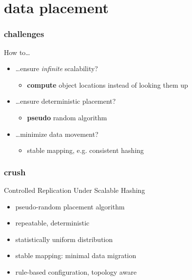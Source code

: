 \documentclass[10pt, compress]{beamer}
\begin{document}
\section{data placement}
\begin{frame}[fragile]
    \frametitle{challenges}
    \begin{block}{How to\dots}
        \begin{itemize}[<+->]
            \item[]\dots ensure \textit{infinite} scalability?
                \begin{itemize}
                    \item \textbf{compute} object locations instead of looking 
                        them up
                \end{itemize}
            \item[]\dots ensure deterministic placement?
                \begin{itemize}
                    \item \textbf{pseudo} random algorithm
                \end{itemize}
            \item[]\dots minimize data movement?
                \begin{itemize}
                    \item stable mapping, e.g. consistent hashing
                \end{itemize}
        \end{itemize}
    \end{block}
\end{frame}

\begin{frame}[fragile]
    \frametitle{crush}
    \begin{block}{\alert{C}ontrolled \alert{R}eplication \alert{U}nder 
        \alert{S}calable \alert{H}ashing}
    \begin{itemize}
        \item pseudo-random placement algorithm
        \item repeatable, deterministic
        \item statistically uniform distribution
        \item stable mapping: minimal data migration
        \item rule-based configuration, topology aware
    \end{itemize}
\end{block}
\end{frame}
\end{document}
